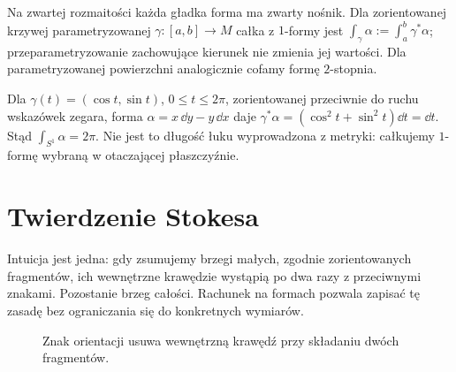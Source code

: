 Na zwartej rozmaitości każda gładka forma ma zwarty
nośnik. Dla zorientowanej krzywej parametryzowanej
$\gamma:[a,b]\to M$ całka z $1$-formy jest
$\int_\gamma\alpha:=\int_a^b\gamma^*\alpha$;
przeparametryzowanie zachowujące kierunek nie zmienia
jej wartości. Dla parametryzowanej powierzchni
analogicznie cofamy formę $2$-stopnia.

\begin{przyklad}
Dla $\gamma(t)=(\cos t,\sin t)$, $0\leq t\leq2\pi$,
zorientowanej przeciwnie do ruchu wskazówek zegara,
forma $\alpha=x\,\dd y-y\,\dd x$ daje
$\gamma^*\alpha=(\cos^2t+\sin^2t)\dd t=\dd t$.
Stąd $\int_{S^1}\alpha=2\pi$.
Nie jest to długość łuku wyprowadzona z metryki:
całkujemy $1$-formę wybraną w otaczającej płaszczyźnie.
\end{przyklad}

\section{Twierdzenie Stokesa}
\label{sec:formy-stokes}

Intuicja jest jedna: gdy zsumujemy brzegi
małych, zgodnie zorientowanych fragmentów,
ich wewnętrzne krawędzie wystąpią po dwa razy
z przeciwnymi znakami. Pozostanie brzeg całości.
Rachunek na formach pozwala zapisać tę zasadę
bez ograniczania się do konkretnych wymiarów.

\begin{figure}[!htbp]
\centering
{}
\caption{Znak orientacji usuwa wewnętrzną krawędź
przy składaniu dwóch fragmentów.}
\label{fig:stokes-anulowanie}
\end{figure}

